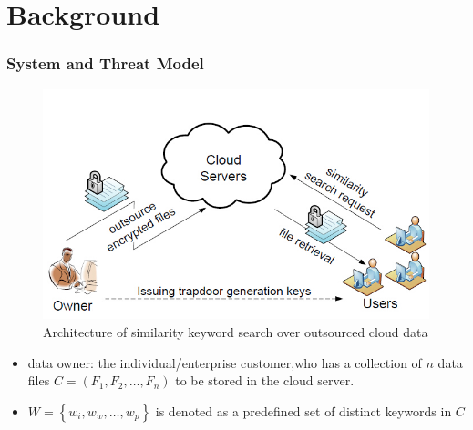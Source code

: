 \documentclass{beamer}
\begin{document}
\section{Background} %
\begin{frame}
	\frametitle{System and Threat Model}
	\begin{figure}
	\includegraphics[width=0.6\linewidth]{fig1.jpg}
	\caption[1]{Architecture of similarity keyword search over outsourced cloud data}
	\end{figure}
		\begin{itemize}
			\item data owner: the individual/enterprise customer,who has a collection of $n$ data files $C = ({F_1},{F_2}, \ldots ,{F_n})$ to be stored in the cloud server.
			\item $W = \left\{ {{w_i},{w_w}, \ldots ,{w_p}} \right\}$ is denoted as a predefined set of distinct keywords in $C$
		\end{itemize}
\end{frame}
\end{document}
